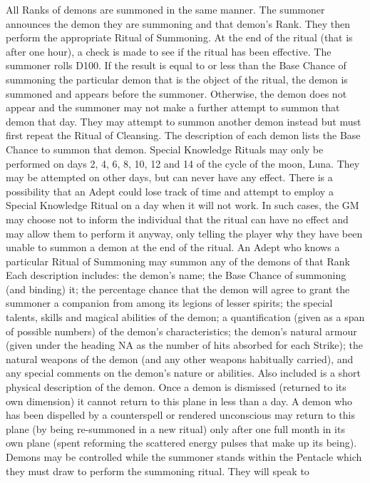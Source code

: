 \documentclass[a4paper]{article}
\begin{document}
\begin{multicols}{3}
All Ranks of demons are summoned in the same
manner. The summoner announces the demon they
are summoning and that demon’s Rank. They then
perform the appropriate Ritual of Summoning. At
the end of the ritual (that is after one hour), a check
is made to see if the ritual has been effective. The
summoner rolls D100. If the result is equal to or
less than the Base Chance of summoning the particular demon that is the object of the ritual, the
demon is summoned and appears before the summoner. Otherwise, the demon does not appear and
the summoner may not make a further attempt to
summon that demon that day. They may attempt to
summon another demon instead but must first
repeat the Ritual of Cleansing. The description of
each demon lists the Base Chance to summon that
demon.
Special Knowledge Rituals may only be performed
on days 2, 4, 6, 8, 10, 12 and 14 of the cycle of the
moon, Luna. They may be attempted on other days,
but can never have any effect. There is a possibility
that an Adept could lose track of time and attempt
to employ a Special Knowledge Ritual on a day
when it will not work. In such cases, the GM may
choose not to inform the individual that the ritual
can have no effect and may allow them to perform
it anyway, only telling the player why they have
been unable to summon a demon at the end of the
ritual.
An Adept who knows a particular Ritual of Summoning may summon any of the demons of that
Rank Each description includes: the demon’s
name; the Base Chance of summoning (and binding) it; the percentage chance that the demon will
agree to grant the summoner a companion from
among its legions of lesser spirits; the special talents, skills and magical abilities of the demon; a
quantification (given as a span of possible numbers) of the demon’s characteristics; the demon’s
natural armour (given under the heading NA as the
number of hits absorbed for each Strike); the natural weapons of the demon (and any other weapons
habitually carried), and any special comments on
the demon’s nature or abilities. Also included is a
short physical description of the demon.
Once a demon is dismissed (returned to its own
dimension) it cannot return to this plane in less
than a day. A demon who has been dispelled by a
counterspell or rendered unconscious may return to
this plane (by being re-summoned in a new ritual)
only after one full month in its own plane (spent
reforming the scattered energy pulses that make up
its being).
Demons may be controlled while the summoner
stands within the Pentacle which they must draw to
perform the summoning ritual. They will speak to

\end{multicols}
\end{document}
